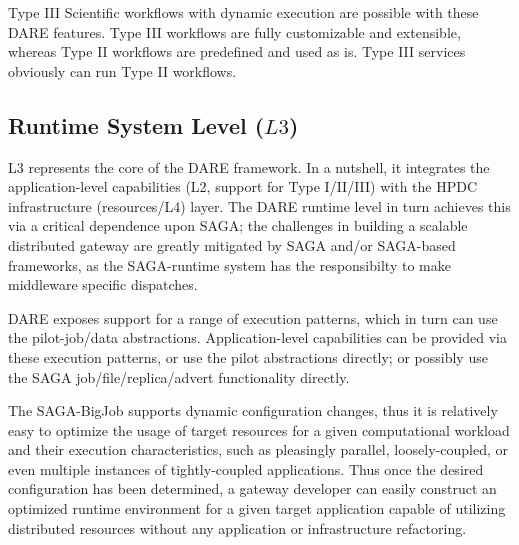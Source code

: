 \documentclass[]{svjour3}
\begin{document}
Type III Scientific workflows with dynamic execution are possible with
these DARE features. Type III workflows are fully customizable and
extensible, whereas Type II workflows are predefined and used as is.
Type III services obviously can run Type II workflows.


\subsection{Runtime System Level ($L3$)}

L3 represents the core of the DARE framework. In a nutshell, it
integrates the application-level capabilities (L2, support for Type
I/II/III) with the HPDC infrastructure (resources/L4) layer.  The DARE
runtime level in turn achieves this via a critical dependence upon
SAGA; the challenges in building a scalable distributed gateway are
greatly mitigated by SAGA and/or SAGA-based frameworks, as the
SAGA-runtime system has the responsibilty to make middleware specific
dispatches.

DARE exposes support for a range of execution patterns, which in turn
can use the pilot-job/data abstractions.  Application-level
capabilities can be provided via these execution patterns, or use the
pilot abstractions directly; or possibly use the SAGA
job/file/replica/advert functionality directly.


The SAGA-BigJob supports dynamic configuration changes, thus it is
relatively easy to optimize the usage of target resources for a given
computational workload and their execution characteristics, such as
pleasingly parallel, loosely-coupled, or even multiple instances of
tightly-coupled applications. Thus once the desired configuration has
been determined, a gateway developer can easily construct an optimized
runtime environment for a given target application capable of
utilizing distributed resources without any application or
infrastructure refactoring.
\end{document}
